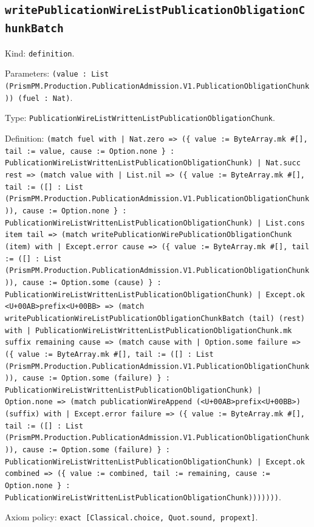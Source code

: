 \documentclass[11pt]{article}
\begin{document}
\subsection*{\texttt{writePublicationWireListPublicationObligationChunkBatch}}
\noindent Kind: \texttt{definition}.\par
\noindent Parameters: \texttt{(value : List (PrismPM.Production.PublicationAdmission.V1.PublicationObligationChunk)) (fuel : Nat)}.\par
\noindent Type: \texttt{PublicationWireListWrittenListPublicationObligationChunk}.\par
\noindent Definition: \texttt{(match fuel with | Nat.zero => (\{ value := ByteArray.mk \#[], tail := value, cause := Option.none \} : PublicationWireListWrittenListPublicationObligationChunk) | Nat.succ rest => (match value with | List.nil => (\{ value := ByteArray.mk \#[], tail := ([] : List (PrismPM.Production.PublicationAdmission.V1.PublicationObligationChunk)), cause := Option.none \} : PublicationWireListWrittenListPublicationObligationChunk) | List.cons item tail => (match writePublicationWirePublicationObligationChunk (item) with | Except.error cause => (\{ value := ByteArray.mk \#[], tail := ([] : List (PrismPM.Production.PublicationAdmission.V1.PublicationObligationChunk)), cause := Option.some (cause) \} : PublicationWireListWrittenListPublicationObligationChunk) | Except.ok <U+00AB>prefix<U+00BB> => (match writePublicationWireListPublicationObligationChunkBatch (tail) (rest) with | PublicationWireListWrittenListPublicationObligationChunk.mk suffix remaining cause => (match cause with | Option.some failure => (\{ value := ByteArray.mk \#[], tail := ([] : List (PrismPM.Production.PublicationAdmission.V1.PublicationObligationChunk)), cause := Option.some (failure) \} : PublicationWireListWrittenListPublicationObligationChunk) | Option.none => (match publicationWireAppend (<U+00AB>prefix<U+00BB>) (suffix) with | Except.error failure => (\{ value := ByteArray.mk \#[], tail := ([] : List (PrismPM.Production.PublicationAdmission.V1.PublicationObligationChunk)), cause := Option.some (failure) \} : PublicationWireListWrittenListPublicationObligationChunk) | Except.ok combined => (\{ value := combined, tail := remaining, cause := Option.none \} : PublicationWireListWrittenListPublicationObligationChunk)))))))}.\par
\noindent Axiom policy: \texttt{exact [Classical.choice, Quot.sound, propext]}.\par
\end{document}
